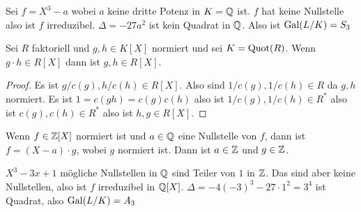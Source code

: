 \begin{Bsp}
	Sei \(f=X^3-a\) wobei \(a\)  keine dritte Potenz in \(K=\mathbb{Q}\) ist.
	\(f\) hat keine Nullstelle also ist \(f\) irreduzibel. \(\Delta=-27a^2\) ist kein Quadrat in \(\mathbb{Q}\). Also ist \(\operatorname{Gal}(L/K)=S_3\)
\end{Bsp}
\begin{Lemma}\label{Lem:RatNst}
	Sei \(R\) faktoriell und \(g,h\in K[X]\) normiert und sei \(K=\operatorname{Quot}(R)\). Wenn \(g\cdot h\in R[X]\) dann ist \(g,h\in R[X]\).
\end{Lemma}
\begin{proof}
	Es ist \(g/c(g), h/c(h)\in R[X]\). Also sind \(1/c(g),1/c(h)\in R\) da \(g,h\) normiert.
	Es ist \(1=c(gh)=c(g)c(h)\) also ist \(1/c(g),1/c(h)\in R^*\) also ist \(c(g),c(h)\in R^*\) also ist \(h,g\in R[X]\).
\end{proof}
\begin{Kor}
	Wenn \(f\in\mathbb{Z}[X]\) normiert ist und \(a\in\mathbb{Q}\) eine Nullstelle von \(f\), dann ist \(f=(X-a)\cdot g\), wobei \(g\) normiert ist. Dann ist \(a\in\mathbb{Z}\) und \(g\in\mathbb{Z}\).
\end{Kor}
\begin{Bsp}
	\(X^3-3x+1\) mögliche Nullstellen in \(\mathbb{Q}\) sind Teiler von \(1\) in \(\mathbb{Z}\). Das sind aber keine Nullstellen, also ist \(f\) irreduzibel in \(\mathbb{Q}[X]\).
	\(\Delta=-4(-3)^3-27\cdot 1^2=3^4\) ist Quadrat, also \(\operatorname{Gal}(L/K)=A_3\)
\end{Bsp}
